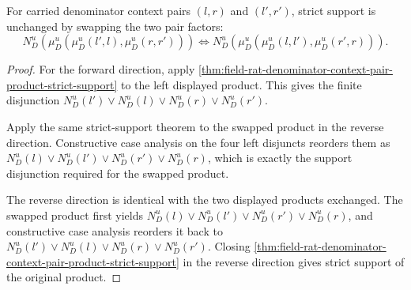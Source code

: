 \begin{theorem}
\label{thm:field-rat-denominator-context-pair-product-strict-support-commutes}
For carried denominator context pairs $(l,r)$ and $(l',r')$, strict support is
unchanged by swapping the two pair factors:
$$
N_D^u(\mu_D^u(\mu_D^u(l',l),\mu_D^u(r,r')))
\Longleftrightarrow
N_D^u(\mu_D^u(\mu_D^u(l,l'),\mu_D^u(r',r))).
$$
\end{theorem}
\begin{proof}
For the forward direction, apply
\autoref{thm:field-rat-denominator-context-pair-product-strict-support} to the
left displayed product. This gives the finite disjunction
$N_D^u(l')\lor N_D^u(l)\lor N_D^u(r)\lor N_D^u(r')$.

Apply the same strict-support theorem to the swapped product in the reverse
direction. Constructive case analysis on the four left disjuncts reorders them
as $N_D^u(l)\lor N_D^u(l')\lor N_D^u(r')\lor N_D^u(r)$, which is exactly the
support disjunction required for the swapped product.

The reverse direction is identical with the two displayed products exchanged.
The swapped product first yields
$N_D^u(l)\lor N_D^u(l')\lor N_D^u(r')\lor N_D^u(r)$, and constructive case
analysis reorders it back to
$N_D^u(l')\lor N_D^u(l)\lor N_D^u(r)\lor N_D^u(r')$. Closing
\autoref{thm:field-rat-denominator-context-pair-product-strict-support} in the
reverse direction gives strict support of the original product.
\end{proof}
